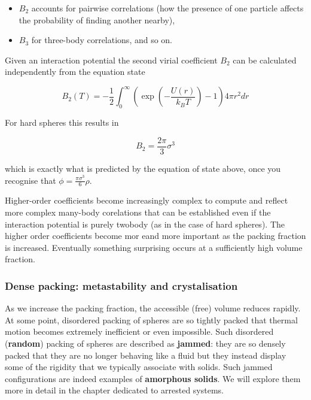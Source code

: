 \documentclass[
  letterpaper,
  enabledeprecatedfontcommands]{report}
\providecommand{\tightlist}{%
  \setlength{\itemsep}{0pt}\setlength{\parskip}{0pt}}
\begin{document}
\begin{itemize}
\tightlist
\item
  \(B_2\) accounts for pairwise correlations (how the presence of one
  particle affects the probability of finding another nearby),
\item
  \(B_3\) for three-body correlations, and so on.
\end{itemize}

Given an interaction potential the second virial coefficient \(B_2\) can
be calculated independently from the equation state

\[
B_2(T)=-\frac{1}{2} \int_0^{\infty}\left(\exp \left(-\frac{U(r)}{k_B T}\right)-1\right) 4 \pi r^2 d r 
\]

For hard spheres this results in

\[
B_2 =  \frac{2\pi}{3} \sigma^3
\]

which is exactly what is predicted by the equation of state above, once
you recognise that \(\phi = \frac{\pi\sigma^3}{6}\rho\).


Higher-order coefficients become increasingly complex to compute and
reflect more complex many-body corelations that can be established even
if the interaction potential is purely twobody (as in the case of hard
spheres). The higher order coefficients become mor eand more important
as the packing fraction is increased. Eventually something surprising
occurs at a sufficiently high volume fraction.

\subsubsection*{Dense packing: metastability and
crystalisation}\label{dense-packing-metastability-and-crystalisation}

As we increase the packing fraction, the accessible (free) volume
reduces rapidly. At some point, disordered packing of spheres are so
tightly packed that thermal motion becomes extremely inefficient or even
impossible. Such disordered (\textbf{random}) packing of spheres are
described as \textbf{jammed}: they are so densely packed that they are
no longer behaving like a fluid but they instead display some of the
rigidity that we typically associate with solids. Such jammed
configurations are indeed examples of \textbf{amorphous solids}. We will
explore them more in detail in the chapter dedicated to arrested
systems.
\end{document}
